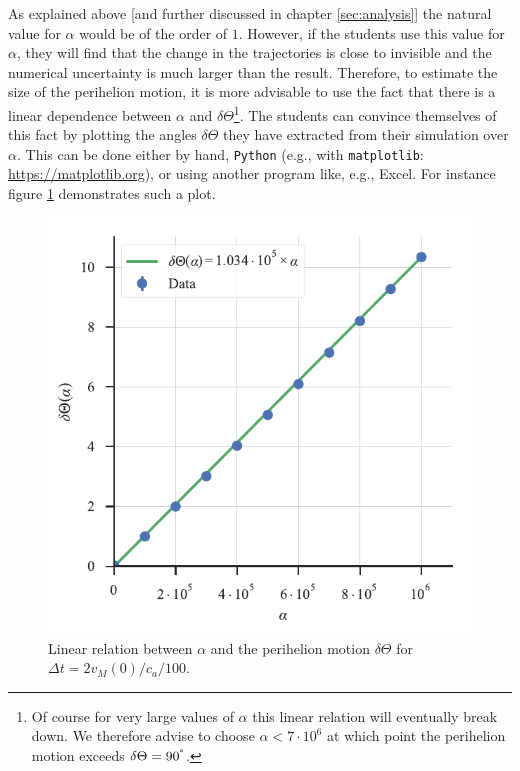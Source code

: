 \documentclass[12pt,ngerman,american]{iopart}
\newcommand{\python}[0]{\texttt{Python}}
\begin{document}
As explained above [and further discussed in chapter \ref{sec:analysis}] the natural value for $\alpha$ would be of the order of $1$.
However, if the students use this value for $\alpha$, they will find that the change in the trajectories is close to invisible and the numerical uncertainty is much larger than the result.
Therefore, to estimate the size of the perihelion motion, it is more advisable to use the fact that there is a linear dependence between $\alpha$ and $\delta \Theta$\footnote{%
	Of course for very large values of $\alpha$ this linear relation will eventually break down.
	We therefore advise to choose $\alpha<7\cdot 10^6$ at which point the perihelion motion exceeds $\delta \Theta=90^{\degree}$.
}.
The students can convince themselves of this fact by plotting the angles $\delta \Theta$ they have extracted from their simulation over $\alpha$.
This can be done either by hand, \python{} (e.g., with \texttt{matplotlib}: \url{https://matplotlib.org}), or using another program like, e.g., Excel.
For instance figure \ref{fig:AlphaAngle} demonstrates such a plot.

\begin{figure}[htb]
	\centering
	\includegraphics{figs/alpha-angle.pdf}
	\caption{\label{fig:AlphaAngle} Linear relation between $\alpha$ and the perihelion motion $\delta \Theta$ for $\Delta t=2v_M(0)/c_a/100$.}
\end{figure}
\end{document}

